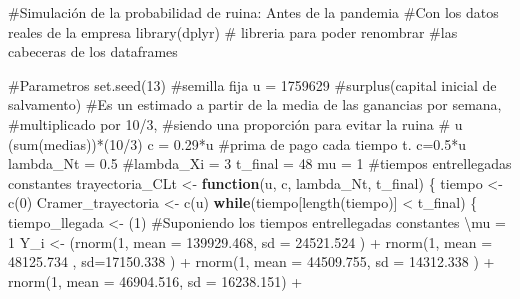\documentclass[
  us-letterpaper,
]{scrreprt}
\newenvironment{Shaded}{\begin{snugshade}}{\end{snugshade}}
\newcommand{\AttributeTok}[1]{\textcolor[rgb]{0.40,0.45,0.13}{#1}}
\newcommand{\CommentTok}[1]{\textcolor[rgb]{0.37,0.37,0.37}{#1}}
\newcommand{\ControlFlowTok}[1]{\textcolor[rgb]{0.00,0.23,0.31}{\textbf{#1}}}
\newcommand{\DecValTok}[1]{\textcolor[rgb]{0.68,0.00,0.00}{#1}}
\newcommand{\FloatTok}[1]{\textcolor[rgb]{0.68,0.00,0.00}{#1}}
\newcommand{\FunctionTok}[1]{\textcolor[rgb]{0.28,0.35,0.67}{#1}}
\newcommand{\NormalTok}[1]{\textcolor[rgb]{0.00,0.23,0.31}{#1}}
\newcommand{\OtherTok}[1]{\textcolor[rgb]{0.00,0.23,0.31}{#1}}
\newcommand{\SpecialCharTok}[1]{\textcolor[rgb]{0.37,0.37,0.37}{#1}}
\theoremstyle{plain}
\theoremstyle{plain}
\theoremstyle{definition}
\theoremstyle{remark}
\begin{document}
\begin{Shaded}
\begin{Highlighting}[]
\CommentTok{\#Simulación de la probabilidad de ruina: Antes de la pandemia}
\CommentTok{\#Con los datos reales de la empresa}
\FunctionTok{library}\NormalTok{(dplyr) }\CommentTok{\# libreria para poder renombrar }
\CommentTok{\#las cabeceras de los dataframes}

\CommentTok{\#Parametros}
\FunctionTok{set.seed}\NormalTok{(}\DecValTok{13}\NormalTok{) }\CommentTok{\#semilla fija}
\NormalTok{u }\OtherTok{=} \DecValTok{1759629} \CommentTok{\#surplus(capital inicial de salvamento)}
\CommentTok{\#Es un estimado a partir de la media de las ganancias por semana, }
\CommentTok{\#multiplicado por 10/3, }
\CommentTok{\#siendo una proporción para evitar la ruina}
\CommentTok{\# u (sum(medias))*(10/3)}
\NormalTok{c }\OtherTok{=} \FloatTok{0.29}\SpecialCharTok{*}\NormalTok{u }\CommentTok{\#prima de pago cada tiempo t. c=0.5*u}
\NormalTok{lambda\_Nt }\OtherTok{=} \FloatTok{0.5}
\CommentTok{\#lambda\_Xi = 3}
\NormalTok{t\_final }\OtherTok{=} \DecValTok{48}
\NormalTok{mu }\OtherTok{=} \DecValTok{1} \CommentTok{\#tiempos entrellegadas constantes}
\NormalTok{trayectoria\_CLt }\OtherTok{\textless{}{-}} \ControlFlowTok{function}\NormalTok{(u, c, lambda\_Nt, t\_final)}
\NormalTok{\{}
\NormalTok{  tiempo }\OtherTok{\textless{}{-}} \FunctionTok{c}\NormalTok{(}\DecValTok{0}\NormalTok{)}
\NormalTok{  Cramer\_trayectoria }\OtherTok{\textless{}{-}} \FunctionTok{c}\NormalTok{(u)}
  \ControlFlowTok{while}\NormalTok{(tiempo[}\FunctionTok{length}\NormalTok{(tiempo)] }\SpecialCharTok{\textless{}}\NormalTok{ t\_final)}
\NormalTok{  \{}
\NormalTok{    tiempo\_llegada }\OtherTok{\textless{}{-}}\NormalTok{ (}\DecValTok{1}\NormalTok{) }
\CommentTok{\#Suponiendo los tiempos entrellegadas constantes \textbackslash{}mu = 1}
\NormalTok{    Y\_i }\OtherTok{\textless{}{-}}\NormalTok{  (}\FunctionTok{rnorm}\NormalTok{(}\DecValTok{1}\NormalTok{, }\AttributeTok{mean =} \FloatTok{139929.468}\NormalTok{, }\AttributeTok{sd =} \FloatTok{24521.524}\NormalTok{ ) }\SpecialCharTok{+}
             \FunctionTok{rnorm}\NormalTok{(}\DecValTok{1}\NormalTok{, }\AttributeTok{mean =} \FloatTok{48125.734}\NormalTok{ , }\AttributeTok{sd=}\FloatTok{17150.338}\NormalTok{ )   }\SpecialCharTok{+}  
             \FunctionTok{rnorm}\NormalTok{(}\DecValTok{1}\NormalTok{, }\AttributeTok{mean =}  \FloatTok{44509.755}\NormalTok{, }\AttributeTok{sd =} \FloatTok{14312.338}\NormalTok{ ) }\SpecialCharTok{+} 
             \FunctionTok{rnorm}\NormalTok{(}\DecValTok{1}\NormalTok{, }\AttributeTok{mean =}   \FloatTok{46904.516}\NormalTok{, }\AttributeTok{sd =} \FloatTok{16238.151}\NormalTok{) }\SpecialCharTok{+} 

\end{Highlighting}
\end{Shaded}
\end{document}
